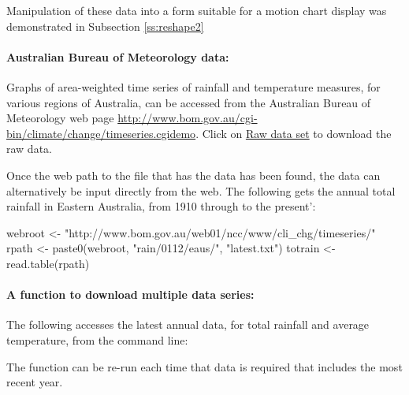 \documentclass{tufte-book}\usepackage[]{graphicx}\usepackage[]{color}
\begin{document}
Manipulation of these data into a form suitable for a motion
chart display was demonstrated in Subsection \ref{ss:reshape2}

\paragraph{Australian Bureau of Meteorology data:}
Graphs of area-weighted time series of rainfall and temperature
measures, for various regions of Australia, can be accessed from the
Australian Bureau of Meteorology web page
\url{http://www.bom.gov.au/cgi-bin/climate/change/timeseries.cgidemo}.
Click on \underline{Raw data set} to download the raw data.

Once the web path to the file that has the data has been found,
the data can alternatively be input directly from the web.
The following gets the annual total rainfall in Eastern Australia,
from 1910 through to the present':
\begin{fullwidth}
\begin{Schunk}
\begin{Sinput}
webroot <- "http://www.bom.gov.au/web01/ncc/www/cli_chg/timeseries/"
rpath <- paste0(webroot, "rain/0112/eaus/", "latest.txt")
totrain <- read.table(rpath)
\end{Sinput}
\end{Schunk}
\end{fullwidth}

\paragraph{A function to download multiple data series:}
The following accesses the latest annual data, for total rainfall
and average temperature, from the command line:
\begin{fullwidth}
\begin{Schunk}
\end{Schunk}
\end{fullwidth}
\noindent
The function can be re-run each time that data is required that
includes the most recent year.
\end{document}
